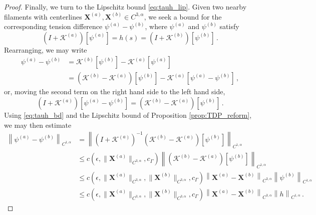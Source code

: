 \documentclass[11pt,reqno]{amsart}
\newcommand{\X}{\bm{X}}
\newcommand{\norm}[1]{\left\lVert #1 \right\rVert}
\newcommand{\mc}[1]{\mathcal{#1}}
\theoremstyle{definition}
\begin{document}
\begin{proof}
Finally, we turn to the Lipschitz bound \eqref{eq:tauh_lip}. Given two nearby filaments with centerlines $\X^{(a)},\X^{(b)}\in C^{3,\alpha}$, we seek a bound for the corresponding tension difference $\psi^{(a)}-\psi^{(b)}$, where $\psi^{(a)}$ and $\psi^{(b)}$ satisfy
\begin{equation}
  (I+\mc{K}^{(a)})[\psi^{(a)}] = h(s) = (I+\mc{K}^{(b)})[\psi^{(b)}]\,.
\end{equation}
Rearranging, we may write 
\begin{equation}
\begin{aligned}
  \psi^{(a)}-\psi^{(b)}&= \mc{K}^{(b)}[\psi^{(b)}] - \mc{K}^{(a)}[\psi^{(a)}]\\
  &= (\mc{K}^{(b)}-\mc{K}^{(a)})[\psi^{(b)}] - \mc{K}^{(a)}[\psi^{(a)}-\psi^{(b)}]\,,
\end{aligned}
\end{equation}
or, moving the second term on the right hand side to the left hand side,
\begin{equation}
  (I+\mc{K}^{(a)})[\psi^{(a)}-\psi^{(b)}] = (\mc{K}^{(b)}-\mc{K}^{(a)})[\psi^{(b)}]\,.
\end{equation}
%
Using \eqref{eq:tauh_bd} and the Lipschitz bound of Proposition \ref{prop:TDP_reform}, we may then estimate 
\begin{equation}
\begin{aligned}
  \norm{\psi^{(a)}-\psi^{(b)}}_{C^{1,\alpha}} &= \norm{(I+\mc{K}^{(a)})^{-1}(\mc{K}^{(b)}-\mc{K}^{(a)})[\psi^{(b)}]}_{C^{1,\alpha}}\\
  &\le c(\epsilon,\|\X^{(a)}\|_{C^{3,\alpha}},c_\Gamma)\norm{(\mc{K}^{(b)}-\mc{K}^{(a)})[\psi^{(b)}]}_{C^{1,\alpha}}\\
  &\le c(\epsilon,\|\X^{(a)}\|_{C^{3,\alpha}},\|\X^{(b)}\|_{C^{3,\alpha}},c_\Gamma)\norm{\X^{(a)}-\X^{(b)}}_{C^{3,\alpha}}\norm{\psi^{(b)}}_{C^{1,\alpha}}\\
  &\le c(\epsilon,\|\X^{(a)}\|_{C^{3,\alpha}},\|\X^{(b)}\|_{C^{3,\alpha}},c_\Gamma)\norm{\X^{(a)}-\X^{(b)}}_{C^{3,\alpha}}\norm{h}_{C^{1,\alpha}}\,.
\end{aligned}
\end{equation}
%
%
%
\end{proof}
\end{document}
